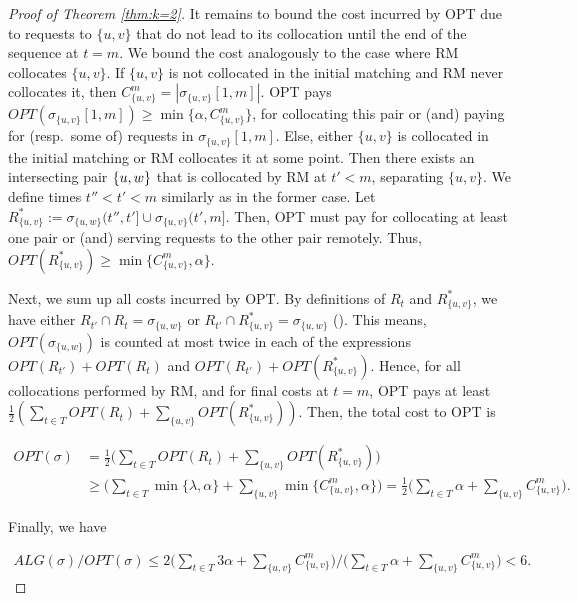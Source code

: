 \documentclass[manuscript,screen=true, review, anonymous]{acmart}
\newcommand{\OPT}{\textsf{OPT}\xspace}
\newcommand{\OPTM}{\mathit{OPT}}
\newcommand{\RM}{\textsf{RM}\xspace} %
\DeclarePairedDelimiter\set{\{}{\}}
\newcommand\mahmoud[1]{}
\begin{document}
\begin{proof}[Proof of Theorem \ref{thm:k=2}]
	It remains to bound the cost  incurred by \OPT due to requests to $\{u,v\}$ that do not lead to its collocation until the end of the sequence at $t=m$.
	We bound the cost analogously to the case where \RM collocates $\{u,v\}$.
	If $\{u,v\}$ is not collocated in the initial matching
	and \RM never collocates it,
	then $ C^{m}_{ \{u,v\} } =| \sigma_{\{u,v\}}[1,m] |$.
	\OPT pays
	$\mathit{OPT} (\sigma_{\{u,v\}}[1,m]) 
	\geq \min{ \{ \alpha, C^{m}_{ \{u,v\} } \} }$,
	for collocating this pair or (and) paying for (resp.~some of) requests in $\sigma_{\{u,v\}}[1,m]$.
	Else,
	either $\{u,v\}$ is collocated in the initial matching
	or \RM collocates it at some point.
	Then there exists an intersecting pair $\set{u,w}$
	that is collocated by \RM at $t' < m$,
	separating $\{u,v\}$.
	We define times $t'' < t' < m$ similarly as in the former case.
	Let $R^*_{\{u,v\}} := \sigma_{\{u,w\}} (t'',t'] \cup \sigma_{\{u,v\}} (t',m]$.
	Then,
	\OPT must pay for collocating at least one pair or (and) serving requests 
	to the other pair remotely.
	Thus,
	$\mathit{OPT} (R^*_{\{u,v\}}) 
	\geq  \min{ \{ C^{m}_{ \{u,v\}}, \alpha \}}$.
	
	Next, we sum up all costs incurred by \OPT.
	By definitions of $R_t$ and $R^*_{\{u,v\}}$, we have either
	$R_{t'} \cap R_t = \sigma_{\{u,w\}}$ or
	$R_{t'} \cap R^*_{\{u,v\}} = \sigma_{\{u,w\}}$
	(\mahmoud{See figure \ref{fig:doubleCount}}). 
	This means,
	$\OPTM ( \sigma_{\{u,w\}})$
	is counted at most twice in each of  the expressions
	$\mathit{OPT} (R_{t'}) + \mathit{OPT} (R_t)$
	and  
	$\mathit{OPT} (R_{t'}) + \mathit{OPT} (R^*_{\{u,v\}})$.
	Hence,
	for all collocations performed by \RM,
	and for final costs at $t=m$,
	\OPT pays at least 
	$\frac{1}{2}(
	\sum_{ t \in T } \mathit{OPT} (R_t) +
	\sum_{\{u,v\}} \mathit{OPT} (R^*_{\{u,v\}})
	) $.
	Then,
	the total cost to \OPT is
	
	\begin{align*} 	%
		\mathit{OPT} (\sigma)
		&=
		\frac{1}{2}
		\Big(
		\sum_{ t \in T} \mathit{OPT} (R_t) 
		+ \sum_{\{u,v\}}\mathit{OPT} (R^*_{\{u,v\}})
		\Big)	\\
		&\geq
		\Big(
		\sum_{ t \in T} \min{ \{ \lambda, \alpha \}}  +
		\sum_{\{u,v\}} \min{ \{C^{m}_{\{u,v\}} , \alpha \} } 
		\Big)		
		=
		\frac{1}{2}		
		\Big(
		\sum_{ t \in T} \alpha  
		+ \sum_{\{u,v\}} C^{m}_{\{u,v\}}
		\Big).
	\end{align*}

Finally, we have

\begin{align*}
	\mathit{ALG} (\sigma)	/
	\mathit{OPT} (\sigma)
	\leq
	2\Big(
	\sum_{ t \in T} 3\alpha +
	\sum_{\{u,v\}} C^{m}_{\{u,v\}}
	\Big)	 \big /
	\Big(
	\sum_{ t \in T} \alpha  
	+ \sum_{\{u,v\}} C^{m}_{\{u,v\}}  
	\Big)	< 6.
\end{align*}

\end{proof}
\end{document}
